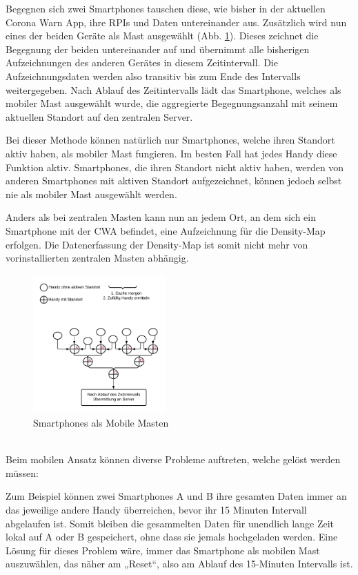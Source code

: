 \documentclass[conference,compsoc]{IEEEtran}
\begin{document}
Begegnen sich zwei Smartphones tauschen diese, wie bisher in der aktuellen Corona Warn App, ihre RPIs und Daten untereinander aus. 
Zusätzlich wird nun eines der beiden Geräte als Mast ausgewählt (Abb. \ref{mobile_mast}). 
Dieses zeichnet die Begegnung der beiden untereinander auf und übernimmt alle bisherigen Aufzeichnungen des anderen Gerätes in diesem Zeitintervall.
Die Aufzeichnungsdaten werden also transitiv bis zum Ende des Intervalls weitergegeben. 
Nach Ablauf des Zeitintervalls lädt das Smartphone, welches als mobiler Mast ausgewählt wurde, die aggregierte Begegnungsanzahl mit seinem aktuellen Standort auf den zentralen Server.

Bei dieser Methode können natürlich nur Smartphones, welche ihren Standort aktiv haben, als mobiler Mast fungieren. 
Im besten Fall hat jedes Handy diese Funktion aktiv. Smartphones, die ihren Standort nicht aktiv haben, werden von anderen Smartphones mit aktiven Standort aufgezeichnet, 
können jedoch selbst nie als mobiler Mast ausgewählt werden.

Anders als bei zentralen Masten kann nun an jedem Ort, an dem sich ein Smartphone mit der CWA befindet, eine Aufzeichnung für die Density-Map erfolgen. 
Die Datenerfassung der Density-Map ist somit nicht mehr von vorinstallierten zentralen Masten abhängig.\\
\begin{figure}[h]
	\centering
	\includegraphics[width=0.45\textwidth]{"Mobile_Mast"}
	\caption{Smartphones als Mobile Masten}
	\label{mobile_mast}
\end{figure} \\
Beim mobilen Ansatz können diverse Probleme auftreten, welche gelöst werden müssen: 

Zum Beispiel können zwei Smartphones A und B ihre gesamten Daten immer an das jeweilige andere Handy überreichen, bevor ihr 15 Minuten Intervall abgelaufen ist. 
Somit bleiben die gesammelten Daten für unendlich lange Zeit lokal auf A oder B gespeichert, ohne dass sie jemals hochgeladen werden. 
Eine Lösung für dieses Problem wäre, immer das Smartphone als mobilen Mast auszuwählen, das näher am „Reset“, also am Ablauf des 15-Minuten Intervalls ist.
\end{document}

